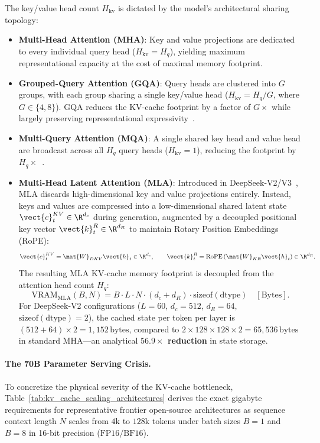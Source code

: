 The key/value head count $H_{\text{kv}}$ is dictated by the model's architectural sharing topology:
\begin{itemize}
    \item \textbf{Multi-Head Attention (MHA)}: Key and value projections are dedicated to every individual query head ($H_{\text{kv}} = H_q$), yielding maximum representational capacity at the cost of maximal memory footprint.
    \item \textbf{Grouped-Query Attention (GQA)}: Query heads are clustered into $G$ groups, with each group sharing a single key/value head ($H_{\text{kv}} = H_q / G$, where $G \in \{4, 8\}$). GQA reduces the KV-cache footprint by a factor of $G\times$ while largely preserving representational expressivity~\cite{ainslie2023gqa}.
    \item \textbf{Multi-Query Attention (MQA)}: A single shared key head and value head are broadcast across all $H_q$ query heads ($H_{\text{kv}} = 1$), reducing the footprint by $H_q\times$~\cite{shazeer2019fast}.
    \item \textbf{Multi-Head Latent Attention (MLA)}: Introduced in DeepSeek-V2/V3~\cite{deepseek2024v2}, MLA discards high-dimensional key and value projections entirely. Instead, keys and values are compressed into a low-dimensional shared latent state $\vect{c}_t^{KV} \in \R^{d_c}$ during generation, augmented by a decoupled positional key vector $\vect{k}_t^R \in \R^{d_R}$ to maintain Rotary Position Embeddings (RoPE):
    \begin{equation}
    \vect{c}_t^{KV} = \mat{W}_{DKV} \vect{h}_t \in \R^{d_c}, \qquad \vect{k}_t^R = \operatorname{RoPE}\left(\mat{W}_{KR} \vect{h}_t\right) \in \R^{d_R}.
    \end{equation}
    The resulting MLA KV-cache memory footprint is decoupled from the attention head count $H_q$:
    \begin{equation}
    \text{VRAM}_{\text{MLA}}(B, N) = B \cdot L \cdot N \cdot (d_c + d_R) \cdot \text{sizeof}(\text{dtype}) \quad [\text{Bytes}].
    \end{equation}
    For DeepSeek-V2 configurations ($L=60$, $d_c = 512$, $d_R = 64$, $\text{sizeof}(\text{dtype})=2$), the cached state per token per layer is $(512 + 64) \times 2 = 1{,}152\,\text{bytes}$, compared to $2 \times 128 \times 128 \times 2 = 65{,}536\,\text{bytes}$ in standard MHA—an analytical \textbf{$56.9\times$ reduction} in state storage.
\end{itemize}

\paragraph{The 70B Parameter Serving Crisis.}
To concretize the physical severity of the KV-cache bottleneck, Table~\ref{tab:kv_cache_scaling_architectures} derives the exact gigabyte requirements for representative frontier open-source architectures as sequence context length $N$ scales from $4\text{k}$ to $128\text{k}$ tokens under batch sizes $B=1$ and $B=8$ in 16-bit precision ($\text{FP16}/\text{BF16}$).

